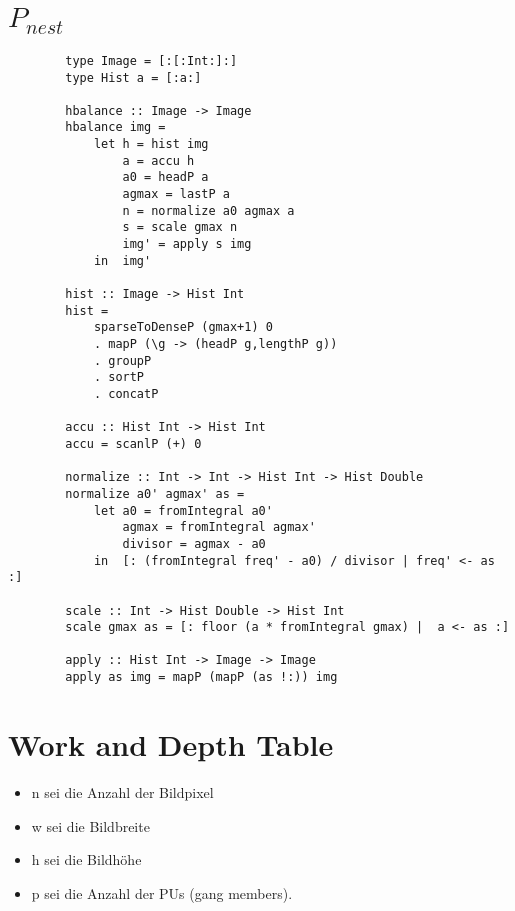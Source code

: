 \documentclass{article}
\newcommand{\ndpn}[0]{$P_{nest}$}
\begin{document}
    \section{ \ndpn }
      \begin{lstlisting}
        type Image = [:[:Int:]:]
        type Hist a = [:a:]

        hbalance :: Image -> Image
        hbalance img =
            let h = hist img
                a = accu h
                a0 = headP a
                agmax = lastP a
                n = normalize a0 agmax a
                s = scale gmax n
                img' = apply s img
            in  img'

        hist :: Image -> Hist Int
        hist = 
            sparseToDenseP (gmax+1) 0
            . mapP (\g -> (headP g,lengthP g))
            . groupP
            . sortP
            . concatP

        accu :: Hist Int -> Hist Int
        accu = scanlP (+) 0

        normalize :: Int -> Int -> Hist Int -> Hist Double
        normalize a0' agmax' as =
            let a0 = fromIntegral a0'
                agmax = fromIntegral agmax'
                divisor = agmax - a0
            in  [: (fromIntegral freq' - a0) / divisor | freq' <- as :]

        scale :: Int -> Hist Double -> Hist Int
        scale gmax as = [: floor (a * fromIntegral gmax) |  a <- as :]

        apply :: Hist Int -> Image -> Image
        apply as img = mapP (mapP (as !:)) img
      \end{lstlisting}
    
    \newpage
    
    \section{Work and Depth Table}
      
      \begin{itemize}
        \item n sei die Anzahl der Bildpixel
        \item w sei die Bildbreite
        \item h sei die Bildhöhe
        \item p sei die Anzahl der PUs (gang members).
      \end{itemize}
      
\end{document}
